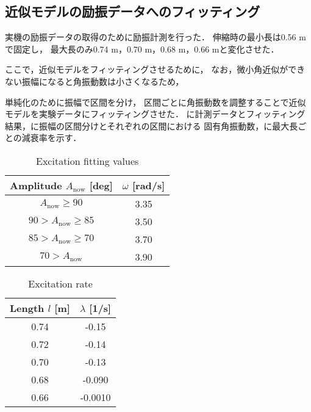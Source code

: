         \subsection{近似モデルの励振データへのフィッティング}
          
          実機の励振データの取得のために励振計測を行った．
          伸縮時の最小長は0.56 mで固定し，
          最大長のみ0.74 m，0.70 m，0.68 m，0.66 mと変化させた．


          ここで，近似モデルをフィッティングさせるために，
          なお，微小角近似ができない振幅になると角振動数は小さくなるため，
          
          単純化のために振幅で区間を分け，
          区間ごとに角振動数を調整することで近似モデルを実験データにフィッティングさせた．
          \figref{}に計測データとフィッティング結果，に振幅の区間分けとそれぞれの区間における
          固有角振動数，に最大長ごとの減衰率を示す．
          \begin{table}[tb]
            \begin{center}
              \caption{Excitation fitting values}
              \vspace{2mm}
              \begin{tabular}{c|c}
                \hline
                Amplitude $A_{\mathrm{now}}$ [deg] & $\omega$ [rad/s]\\
                \hline
                $A_{\mathrm{now}}\ge90$ & 3.35 \\
                $90>A_{\mathrm{now}}\ge85$ & 3.50 \\
                $85>A_{\mathrm{now}}\ge70$ & 3.70 \\
                $70>A_{\mathrm{now}}$ & 3.90 \\                   
                \hline
              \end{tabular}
            \end{center}
          \end{table}
          \begin{table}[tb]
            \begin{center}
              \caption{Excitation rate}
              \vspace{2mm}
              \begin{tabular}{c|c}
                \hline
                Length $l$ [m] & $\lambda$ [1/s] \\
                \hline
                0.74 & -0.15 \\
                0.72 & -0.14 \\
                0.70 & -0.13 \\
                0.68 & -0.090 \\
                0.66 & -0.0010 \\                     
                \hline
              \end{tabular}
            \end{center}
          \end{table}
